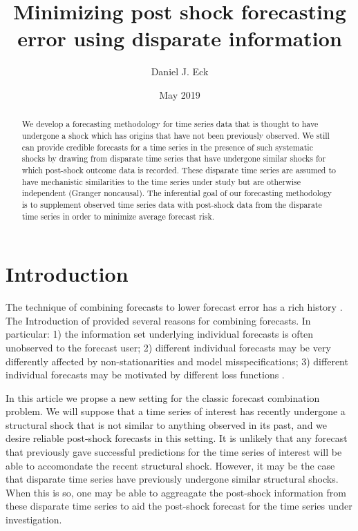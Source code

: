 \documentclass[11pt]{article}
\title{Minimizing post shock forecasting error using disparate information}
\author{Daniel J. Eck}
\date{May 2019}
\begin{document}
\maketitle
\begin{abstract}
    We develop a forecasting methodology for time series data that is 
    thought to have undergone a shock which has origins that have not been 
    previously observed.  We still can provide credible forecasts for a time 
    series in the presence of such systematic shocks by drawing from disparate 
    time series that have undergone similar shocks for which post-shock 
    outcome data is recorded.  These disparate time series are assumed to have 
    mechanistic similarities to the time series under study but are otherwise 
    independent (Granger noncausal).  The inferential goal of our forecasting 
    methodology is to supplement observed time series data with post-shock 
    data from the disparate time series in order to minimize average forecast 
    risk. 
\end{abstract}


\section{Introduction}
The technique of combining forecasts to lower forecast error has a rich 
history \citep{bates1969combination, mundlak1978pooling, 
  timmermann2006forecast, granger2014forecasting}.  
The Introduction of \citet{timmermann2006forecast} provided several reasons 
for combining forecasts.  In particular: 
1) the information set underlying individual forecasts is often unobserved to 
the forecast user; 2) different individual forecasts may be very differently 
affected by non-stationarities and model misspecifications; 3) different 
individual forecasts may be motivated by different loss functions 
\citep[and references therein]{timmermann2006forecast}.


In this article we propse a new setting for the classic forecast combination 
problem.  We will suppose that a time series of interest has recently 
undergone a structural shock that is not similar to anything observed in its 
past, and we desire reliable post-shock forecasts in this setting.  It is 
unlikely that any forecast that previously gave successful predictions for  
the time series of interest will be able to accomondate the recent structural 
shock.  However, it may be the case that disparate time series have previously 
undergone similar structural shocks.  When this is so, one may be able to 
aggreagate the post-shock information from these disparate time series to aid 
the post-shock forecast for the time series under investigation.  
\end{document}
